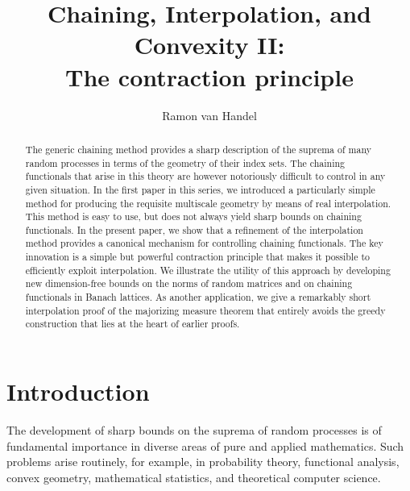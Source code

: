 \documentclass[10pt,reqno]{amsart}
\theoremstyle{definition}
\numberwithin{equation}{section}
\numberwithin{figure}{section}
\numberwithin{table}{section}
\begin{document}
\title[Chaining, Interpolation, and Convexity II]{Chaining, 
Interpolation, and Convexity II: \\ The contraction principle}
\author{Ramon van Handel}
\address{Fine Hall 208, Princeton University, Princeton, NJ 
08544, USA}

\begin{abstract} The generic chaining method provides a sharp description 
of the suprema of many random processes in terms of the geometry of their 
index sets. The chaining functionals that arise in this theory are however 
notoriously difficult to control in any given situation. In the first 
paper in this series, we introduced a particularly simple method for 
producing the requisite multiscale geometry by means of real 
interpolation. This method is easy to use, but does not always yield sharp 
bounds on chaining functionals. In the present paper, we show that a 
refinement of the interpolation method provides a canonical mechanism for 
controlling chaining functionals. The key innovation is a simple but 
powerful contraction principle that makes it possible to efficiently 
exploit interpolation. We illustrate the utility of this 
approach by developing new dimension-free bounds on the norms of random 
matrices and on chaining functionals in Banach lattices. As another 
application, we give a remarkably short interpolation proof of the 
majorizing measure theorem that entirely avoids the greedy construction 
that lies at the heart of earlier proofs. \end{abstract}



\maketitle

\thispagestyle{empty}

\section{Introduction}

The development of sharp bounds on the suprema of random processes is of 
fundamental importance in diverse areas of pure and applied mathematics. 
Such problems arise routinely, for example, in probability theory, 
functional analysis, convex geometry, mathematical statistics, and 
theoretical computer science. 
\end{document}
